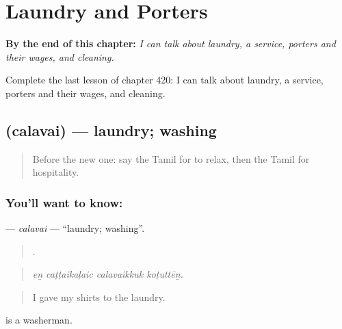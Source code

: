 
\chapter{Laundry and Porters}
\label{ch:ta-laundry-and-porters}

\begin{chapteropening}
\textbf{By the end of this chapter:} \emph{I can talk about laundry, a service, porters and their wages, and cleaning.}

Complete the last lesson of chapter 420: I can talk about laundry, a service, porters and their wages, and cleaning.
\end{chapteropening}

\section[\texorpdfstring{\ta{சலவை} (calavai)}{சலவை (calavai)}]{ (calavai) — laundry; washing}

\label{lesson:TA-C420-calavai}



\begin{quote}
Before the new one: say the Tamil for to relax, then the Tamil for hospitality.
\end{quote}

\subsection*{You'll want to know: }
\textbf{} — \emph{calavai} — \textquotedblleft{}laundry; washing\textquotedblright{}.

\begin{quote}
   .
\end{quote}

\begin{quote}
\emph{eṉ caṭṭaikaḷaic calavaikkuk koṭuttēṉ.}
\end{quote}

\begin{quote}
I gave my shirts to the laundry.
\end{quote}

  is a washerman.

